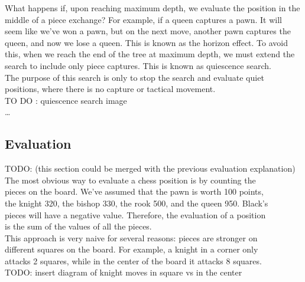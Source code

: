 What happens if, upon reaching maximum depth, we evaluate the position in the\\
middle of a piece exchange? For example, if a queen captures a pawn. It will\\
seem like we've won a pawn, but on the next move, another pawn captures the\\
queen, and now we lose a queen. This is known as the horizon effect. To avoid\\
this, when we reach the end of the tree at maximum depth, we must extend the\\
search to include only piece captures. This is known as quiescence search.\\

The purpose of this search is only to stop the search and evaluate quiet\\
positions, where there is no capture or tactical movement.\\

TO DO : quiescence search  image\\

\ldots

\subsection{Evaluation}

TODO: (this section could be merged with the previous evaluation explanation) \\

The most obvious way to evaluate a chess position is by counting the\\
pieces on the board. We've assumed that the pawn is worth 100 points,\\
the knight 320, the bishop 330, the rook 500, and the queen 950. Black's\\
pieces will have a negative value. Therefore, the evaluation of a position\\
is the sum of the values of all the pieces.\\

This approach is very naive for several reasons: pieces are stronger on\\
different squares on the board. For example, a knight in a corner only\\
attacks 2 squares, while in the center of the board it attacks 8 squares.\\

TODO: insert diagram of knight moves in square vs in the center\\

